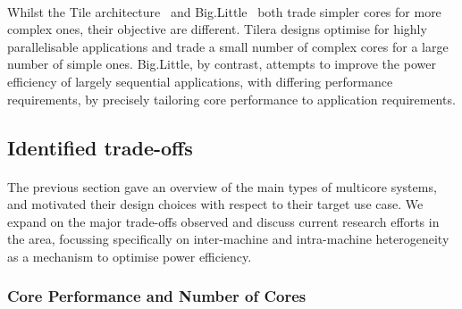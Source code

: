 \paragraph{} Whilst the Tile architecture~\cite{wentzlaff2007tile} and Big.Little~\cite{greenhalgh2011biglittle} both trade simpler cores for 
more complex ones, their objective are different. Tilera designs optimise
for highly parallelisable applications and trade a small number of 
complex cores for a large number of simple ones. Big.Little, by contrast, attempts to improve the power efficiency of largely sequential applications, with differing performance requirements, by precisely tailoring core performance to application requirements. 

\subsection{Identified trade-offs}

\paragraph{} The previous section gave an overview of the main types of multicore systems, 
and motivated their design choices with respect to their target use case.
We expand on the major trade-offs observed and discuss current research efforts in the area, focussing specifically on inter-machine and intra-machine heterogeneity as a mechanism
to optimise power efficiency. 

\subsubsection{Core Performance and Number of Cores}

